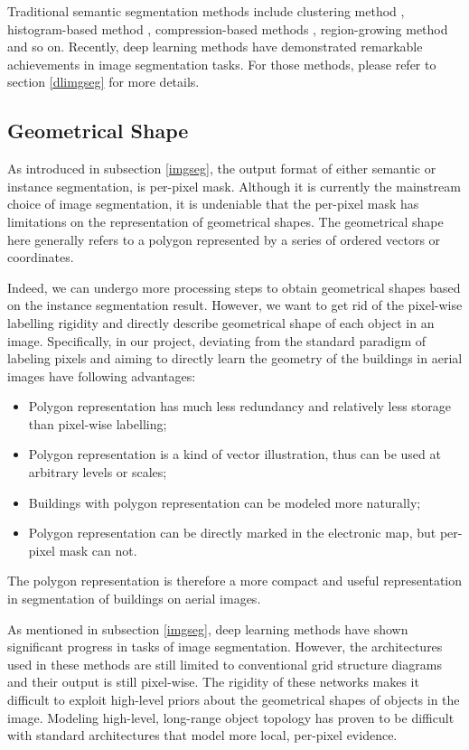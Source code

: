 Traditional semantic segmentation methods include clustering method \cite{imgsegclustering}, histogram-based method \cite{cvbookstockman}, compression-based methods \cite{imgsegcompress}, region-growing method \cite{imgsegregion} and so on. Recently, deep learning methods have demonstrated remarkable achievements in image segmentation tasks. For those methods, please refer to section \ref{dlimgseg} for more details.

\subsection{Geometrical Shape}\label{geosha}
As introduced in subsection \ref{imgseg}, the output format of either semantic or instance segmentation, is per-pixel mask. Although it is currently the mainstream choice of image segmentation, it is undeniable that the per-pixel mask has limitations on the representation of geometrical shapes. The geometrical shape here generally refers to a polygon represented by a series of ordered vectors or coordinates.

Indeed, we can undergo more processing steps to obtain geometrical shapes based on the instance segmentation result. However, we want to get rid of the pixel-wise labelling rigidity and directly describe geometrical shape of each object in an image. Specifically, in our project, deviating from the standard paradigm of labeling pixels and aiming to directly learn the geometry of the buildings in aerial images have following advantages:
\begin{itemize}
\item Polygon representation has much less redundancy and relatively less storage than pixel-wise labelling;
\item Polygon representation is a kind of vector illustration, thus can be used at arbitrary levels or scales;
\item Buildings with polygon representation can be modeled more naturally;
\item Polygon representation can be directly marked in the electronic map, but per-pixel mask can not.
\end{itemize}
The polygon representation is therefore a more compact and useful representation in segmentation of buildings on aerial images.

As mentioned in subsection \ref{imgseg}, deep learning methods have shown significant progress in tasks of image segmentation. However, the architectures used in these methods are still limited to conventional grid structure diagrams and their output is still pixel-wise. The rigidity of these networks makes it difficult to exploit high-level priors about the geometrical shapes of objects in the image. Modeling high-level, long-range object topology has proven to be difficult with standard architectures that model more local, per-pixel evidence.

